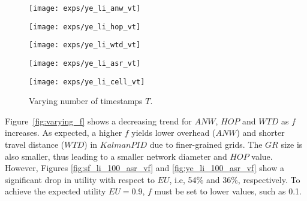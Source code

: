 \documentclass{USC-Thesis}
\numberwithin{equation}{chapter}
\begin{document}
\begin{comment}
\begin{figure}[tbh]
	\begin{minipage}[b]{0.49\linewidth}
	\centering
		\texttt{[image: figures/yelp\_005]}
		\subcaption{KalmanPID, $f = 10\%$}
		\label{fig:yelp_005}
	\end{minipage}
	\begin{minipage}[b]{0.49\linewidth}
	\centering
		\texttt{[image: figures/yelp\_0005]}
		\subcaption{BasicD ($f = 50\%$)}
		\label{fig:yelp_0005}
	\end{minipage}
	\caption{AG Structure visualization for Yelp dataset.}
\label{fig:yelp_gs}
\end{figure}
\end{comment}

\begin{figure*}[tbh]
	\begin{minipage}[b]{0.195\linewidth}
	\centering
		\texttt{[image: exps/ye\_li\_anw\_vt]}
		\label{fig:ye_li_anw_vt}
	\end{minipage}
	\begin{minipage}[b]{0.195\linewidth}
	\centering
		\texttt{[image: exps/ye\_li\_hop\_vt]}
		\label{fig:ye_li_hop_vt}
	\end{minipage}
	\begin{minipage}[b]{0.195\linewidth}
	\centering
		\texttt{[image: exps/ye\_li\_wtd\_vt]}
		\label{fig:ye_li_wtd_vt}
	\end{minipage}	
	\begin{minipage}[b]{0.195\linewidth}
		\centering
		\texttt{[image: exps/ye\_li\_asr\_vt]}
		\label{fig:ye_li_asr_vt}
	\end{minipage}
		\begin{minipage}[b]{0.195\linewidth}
		\centering
		\texttt{[image: exps/ye\_li\_cell\_vt]}
		\label{fig:ye_li_cell_vt}
	\end{minipage}
	\caption{Varying number of timestamps $T$.}
\label{fig:varying_t}
\end{figure*}

Figure~\ref{fig:varying_f} shows a decreasing trend for $\mathit{ANW}$, $\mathit{HOP}$ and $\mathit{WTD}$ as $f$ increases. As expected, a higher $f$ yields lower overhead ($\mathit{ANW}$) and shorter travel distance ($\mathit{WTD}$) in $\mathit{KalmanPID}$ due to finer-grained grids. The $\mathit{GR}$ size is also smaller, thus leading to a smaller network diameter and $\mathit{HOP}$ value. However, Figures \ref{fig:sf_li_100_asr_vf} and \ref{fig:ye_li_100_asr_vf} show a significant drop in utility with respect to $\mathit{EU}$, i.e, 54\% and 36\%, respectively. To achieve the expected utility $\mathit{EU}=0.9$, $f$ must be set to lower values, such as 0.1. 
\end{document}
